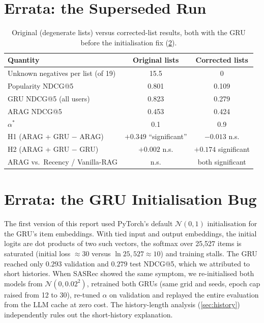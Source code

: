 \documentclass[11pt,a4paper]{article}
\begin{document}
\section{Errata: the Superseded Run}
\label{app:errata}

\begin{table}[h]
\centering
\caption{Original (degenerate lists) versus corrected-list results, both with the GRU before
the initialisation fix (\cref{app:initbug}).}
\label{tab:errata}
\small
\begin{tabular}{lcc}
\toprule
Quantity & Original lists & Corrected lists \\
\midrule
Unknown negatives per list (of 19) & 15.5 & 0 \\
Popularity NDCG@5 & 0.801 & 0.109 \\
GRU NDCG@5 (all users) & 0.823 & 0.279 \\
ARAG NDCG@5 & 0.453 & 0.424 \\
$\alpha^*$ & 0.1 & 0.9 \\
H1 (ARAG + GRU $-$ ARAG) & $+0.349$ ``significant'' & $-0.013$ n.s. \\
H2 (ARAG + GRU $-$ GRU) & $+0.002$ n.s. & $+0.174$ significant \\
ARAG vs.\ Recency / Vanilla-RAG & n.s. & both significant \\
\bottomrule
\end{tabular}
\end{table}

\section{Errata: the GRU Initialisation Bug}
\label{app:initbug}

The first version of this report used PyTorch's default $\mathcal{N}(0,1)$ initialisation for
the GRU's item embeddings. With tied input and output embeddings, the initial logits are dot
products of two such vectors, the softmax over 25{,}527 items is saturated (initial loss $\approx30$
versus $\ln 25{,}527\approx10$) and training stalls. The GRU reached only $0.293$ validation and
$0.279$ test NDCG@5, which we attributed to short histories. When SASRec showed the same symptom,
we re-initialised both models from $\mathcal{N}(0,0.02^2)$, retrained both GRUs (same grid and
seeds, epoch cap raised from 12 to 30), re-tuned $\alpha$ on validation and replayed the entire
evaluation from the LLM cache at zero cost. The history-length analysis (\cref{sec:history})
independently rules out the short-history explanation.
\end{document}
